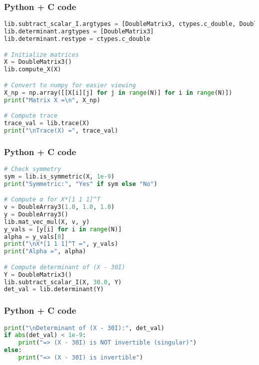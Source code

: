 \documentclass{beamer}
\begin{document}
\begin{frame}[fragile]
    \frametitle{Python + C code}

    \begin{lstlisting}[language=Python]
lib.subtract_scalar_I.argtypes = [DoubleMatrix3, ctypes.c_double, DoubleMatrix3]
lib.determinant.argtypes = [DoubleMatrix3]
lib.determinant.restype = ctypes.c_double

# Initialize matrices
X = DoubleMatrix3()
lib.compute_X(X)

# Convert to numpy for easier viewing
X_np = np.array([[X[i][j] for j in range(N)] for i in range(N)])
print("Matrix X =\n", X_np)

# Compute trace
trace_val = lib.trace(X)
print("\nTrace(X) =", trace_val)
\end{lstlisting}
\end{frame}
\begin{frame}[fragile]
\frametitle{Python + C code}
    \begin{lstlisting}[language=Python]
    # Check symmetry
sym = lib.is_symmetric(X, 1e-9)
print("Symmetric:", "Yes" if sym else "No")

# Compute α for X*[1 1 1]^T
v = DoubleArray3(1.0, 1.0, 1.0)
y = DoubleArray3()
lib.mat_vec_mul(X, v, y)
y_vals = [y[i] for i in range(N)]
alpha = y_vals[0]
print("\nX*[1 1 1]^T =", y_vals)
print("Alpha =", alpha)

# Compute determinant of (X - 30I)
Y = DoubleMatrix3()
lib.subtract_scalar_I(X, 30.0, Y)
det_val = lib.determinant(Y)
    \end{lstlisting}
\end{frame}
\begin{frame}[fragile]
\frametitle{Python + C code}
    \begin{lstlisting}[language=Python]
print("\nDeterminant of (X - 30I):", det_val)
if abs(det_val) < 1e-9:
    print("=> (X - 30I) is NOT invertible (singular)")
else:
    print("=> (X - 30I) is invertible")
     \end{lstlisting}
\end{frame}
\end{document}
